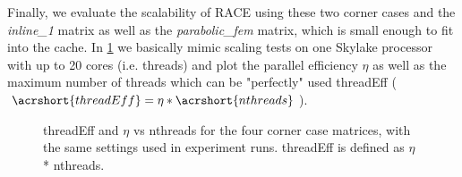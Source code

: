 Finally, we evaluate the scalability of RACE using these two corner cases and the \emph{inline\_1} matrix as well as the \emph{parabolic\_fem} matrix, which is small enough to fit into the cache. 
In \cref{fig:corner_cases_param} we basically mimic scaling tests on one Skylake processor with up to 20 cores (i.e. threads) and plot the parallel efficiency $\eta$ as well as the maximum number of threads which can be "perfectly" used \acrshort{threadEff} (\ie $\acrshort{threadEff} = \eta*\acrshort{nthreads}$). 
%
\begin{figure}[tbhp]
	\centering
	\caption{\acrshort{threadEff} and $\eta$ vs \acrshort{nthreads} for the four corner case matrices, with the same settings used in experiment runs. \acrshort{threadEff} is defined as $\eta$ * \acrshort{nthreads}.}
	\label{fig:corner_cases_param}
\end{figure}

